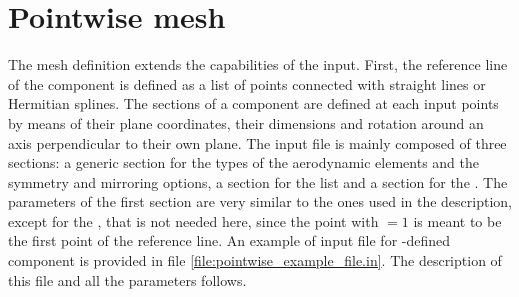 \section{Pointwise mesh}
\label{sec:Pointwise_mesh}
%
The  mesh definition extends the capabilities of the  input. 
First, the reference line of the component is defined as a list of points connected with straight 
lines or Hermitian splines. The sections of a component are defined at each input points by means 
of their plane coordinates, their dimensions and rotation around an axis perpendicular to their own plane.
%
The input file is mainly composed of three sections: a generic section for the types of the 
aerodynamic elements and the symmetry and mirroring options, a section for the  
list and a section for the . The parameters of the first section are very similar 
to the ones used in the  description, except for the , 
that is not needed here, since the point with $=1$ is meant to be the first point of 
the reference line.
\newline \noindent
%
An example of input file for -defined component is provided in file 
\ref{file:pointwise_example_file.in}. The description of this file and all the parameters follows.
%

